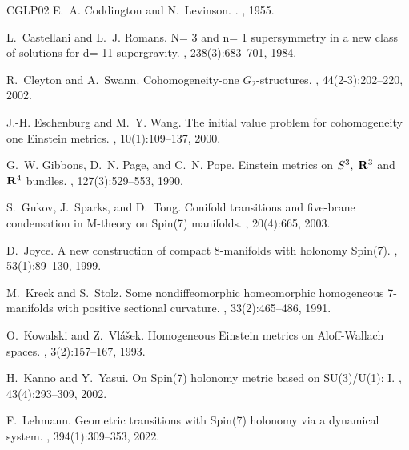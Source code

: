 \documentclass[11pt,letterpaper]{amsart}
\theoremstyle{definition}
\numberwithin{equation}{section}
\begin{document}
\begin{thebibliography}{CGLP02}
E.~A. Coddington and N.~Levinson.
.
, 1955.

L.~Castellani and L.~J. Romans.
\newblock N= 3 and n= 1 supersymmetry in a new class of solutions for d= 11
  supergravity.
, 238(3):683--701, 1984.

R.~Cleyton and A.~Swann.
\newblock Cohomogeneity-one {$G_2$}-structures.
, 44(2-3):202--220, 2002.

J.-H. Eschenburg and M.~Y. Wang.
\newblock The initial value problem for cohomogeneity one {{Einstein}} metrics.
, 10(1):109--137, 2000.

G.~W. Gibbons, D.~N. Page, and C.~N. Pope.
\newblock Einstein metrics on {$S^3,\;{\bf R}^3$} and {${\bf R}^4$} bundles.
, 127(3):529--553, 1990.

S.~Gukov, J.~Sparks, and D.~Tong.
\newblock Conifold transitions and five-brane condensation in {M}-theory on
  {{Spin}}(7) manifolds.
, 20(4):665, 2003.

D.~Joyce.
\newblock A new construction of compact 8-manifolds with holonomy {Spin}(7).
, 53(1):89--130, 1999.

M.~Kreck and S.~Stolz.
\newblock Some nondiffeomorphic homeomorphic homogeneous 7-manifolds with
  positive sectional curvature.
, 33(2):465--486, 1991.

O.~Kowalski and Z.~Vl{\'a}{\v s}ek.
\newblock Homogeneous {{Einstein}} metrics on {{Aloff}}-{{Wallach}} spaces.
, 3(2):157--167,
  1993.

H.~Kanno and Y.~Yasui.
\newblock On {{Spin}}(7) holonomy metric based on {{SU}}(3)/{{U}}(1): {{I}}.
, 43(4):293--309, 2002.

F.~Lehmann.
\newblock Geometric transitions with {Spin(7)} holonomy via a dynamical system.
, 394(1):309--353, 2022.


\end{thebibliography}
\end{document}
